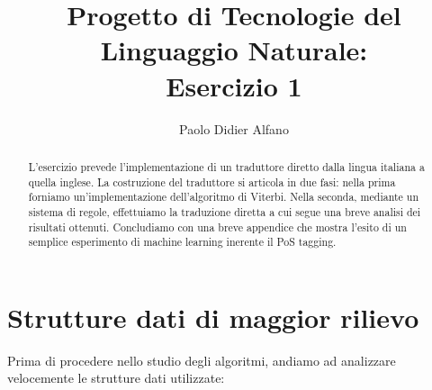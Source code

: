 \documentclass[10pt]{article}
\title{Progetto di Tecnologie del Linguaggio Naturale:\\Esercizio 1}
\date{}
\author{Paolo Didier Alfano}
\affil{Università degli Studi di Torino}
\begin{document}
\maketitle

\begin{abstract}
	L'esercizio prevede l'implementazione di un traduttore diretto dalla lingua italiana a quella inglese. La costruzione del traduttore si articola in due fasi: nella prima forniamo un'implementazione dell'algoritmo di Viterbi. Nella seconda, mediante un sistema di regole, effettuiamo la traduzione diretta a cui segue una breve analisi dei risultati ottenuti. Concludiamo con una breve appendice che mostra l'esito di un semplice esperimento di machine learning inerente il PoS tagging.
\end{abstract}

\section{Strutture dati di maggior rilievo}
Prima di procedere nello studio degli algoritmi, andiamo ad analizzare velocemente le strutture dati utilizzate:
\end{document}
